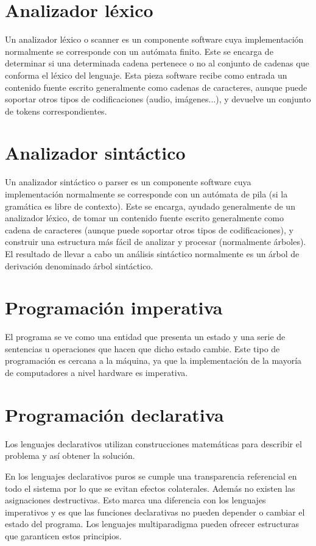\section {Analizador léxico}
Un analizador léxico o scanner es un componente software cuya implementación normalmente se corresponde con un autómata finito. Este se encarga de determinar si una determinada cadena pertenece o no al conjunto de cadenas 
que conforma el léxico del lenguaje. Esta pieza software recibe como entrada un contenido fuente escrito generalmente como cadenas de caracteres, aunque puede soportar otros tipos de codificaciones
(audio, imágenes...), y devuelve un conjunto de tokens correspondientes. 

\section {Analizador sintáctico}
Un analizador sintáctico o parser es un componente software cuya implementación normalmente se corresponde con un autómata de pila (si la gramática es libre de contexto). Este se encarga, ayudado generalmente de un analizador léxico,
de tomar un contenido fuente escrito generalmente como cadena de caracteres (aunque puede soportar otros tipos de codificaciones), y construir una estructura más fácil de analizar y procesar 
(normalmente árboles). El resultado de llevar a cabo un análisis sintáctico normalmente es un árbol de derivación denominado árbol sintáctico. 


\section {Programación imperativa}
El programa se ve como una entidad que presenta un estado y una serie de sentencias u operaciones que hacen que dicho estado cambie. Este tipo de programación es cercana a la 
máquina, ya que la implementación de la mayoría de computadores a nivel hardware es imperativa. 

\section {Programación declarativa}
Los lenguajes declarativos utilizan construcciones matemáticas para describir el problema y así obtener la solución.  

En los lenguajes declarativos puros se cumple una transparencia referencial en todo el sistema por lo
que se evitan efectos colaterales. Además no existen las asignaciones destructivas. Esto marca una diferencia 
con los lenguajes imperativos y es que las funciones declarativas no pueden depender o cambiar el estado del 
programa. Los lenguajes multiparadigma pueden ofrecer estructuras que garanticen estos principios.


